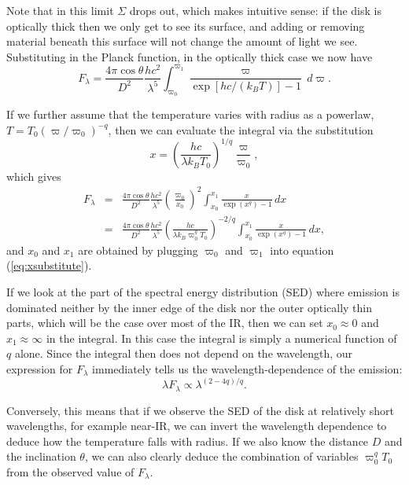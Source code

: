 Note that in this limit $\Sigma$ drops out, which makes intuitive sense: if the disk is optically thick then we only get to see its surface, and adding or removing material beneath this surface will not change the amount of light we see. Substituting in the Planck function, in the optically thick case we now have
\begin{equation}
F_{\lambda} = \frac{4\pi\cos\theta}{D^2} \frac{hc^2}{\lambda^5} \int_{\varpi_0}^{\varpi_1} \frac{\varpi}{\exp[hc/(k_B T)]-1}\,d\varpi.
\end{equation}

If we further assume that the temperature varies with radius as a powerlaw, $T=T_0(\varpi/\varpi_0)^{-q}$, then we can evaluate the integral via the substitution
\begin{equation}
\label{eq:xsubstitute}
x=\left(\frac{hc}{\lambda k_B T_0}\right)^{1/q} \frac{\varpi}{\varpi_0},
\end{equation}
which gives
\begin{eqnarray}
F_{\lambda} & = & 
\frac{4\pi \cos\theta}{D^2} \frac{hc^2}{\lambda^5} \left(\frac{\varpi_0}{x_0}\right)^2 \int_{x_0}^{x_1} \frac{x}{\exp(x^q)-1}\,dx \\
& = & 
\frac{4\pi \cos\theta}{D^2} \frac{hc^2}{\lambda^5} \left(\frac{hc}{\lambda k_B \varpi_0^q T_0}\right)^{-2/q} \int_{x_0}^{x_1} \frac{x}{\exp(x^q)-1}\,dx,
\end{eqnarray}
and $x_0$ and $x_1$ are obtained by plugging $\varpi_0$ and $\varpi_1$ into equation (\ref{eq:xsubstitute}).

If we look at the part of the spectral energy distribution (SED) where emission is dominated neither by the inner edge of the disk nor the outer optically thin parts, which will be the case over most of the IR, then we can set $x_0\approx 0$ and $x_1\approx \infty$ in the integral. In this case the integral is simply a numerical function of $q$ alone. Since the integral then does not depend on the wavelength, our expression for $F_{\lambda}$ immediately tells us the wavelength-dependence of the emission:
\begin{equation}
\lambda F_{\lambda} \propto \lambda^{(2-4q)/q}.
\end{equation}

Conversely, this means that if we observe the SED of the disk at relatively short wavelengths, for example near-IR, we can invert the wavelength dependence to deduce how the temperature falls with radius. If we also know the distance $D$ and the inclination $\theta$, we can also clearly deduce the combination of variables $\varpi_0^q T_0$ from the observed value of $F_\lambda$.

